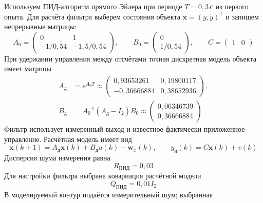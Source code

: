 Используем ПИД-алгоритм прямого Эйлера
при периоде $T=0{,}3\,\text{с}$ из первого опыта.
Для расчёта фильтра выберем состояния объекта
$\bm x=(y,\dot y)^{\mathsf T}$ и запишем непрерывные матрицы:
\begin{equation}
  A_0=\begin{pmatrix}0&1\\-1/0{,}54&-1{,}5/0{,}54\end{pmatrix},
  \qquad B_0=\begin{pmatrix}0\\1/0{,}54\end{pmatrix},
  \qquad C=\begin{pmatrix}1&0\end{pmatrix}
  \label{eq:temperature-continuous-matrices}
\end{equation}
При удержании управления между отсчётами точная дискретная модель
объекта имеет матрицы
\begin{equation}
  \begin{aligned}
    A_{\text{д}}&=e^{A_0T}
      \approx\begin{pmatrix}
        0{,}93653261&0{,}19800117\\
        -0{,}36666884&0{,}38652936
      \end{pmatrix},\\
    B_{\text{д}}&=A_0^{-1}(A_{\text{д}}-I_2)B_0
      \approx\begin{pmatrix}0{,}06346739\\0{,}36666884\end{pmatrix}
  \end{aligned}
  \label{eq:temperature-discrete-matrices}
\end{equation}
Фильтр использует измеренный выход и известное фактически приложенное
управление. Расчётная модель имеет вид
\begin{equation}
  \bm x(k+1)=A_{\text{д}}\bm x(k)+B_{\text{д}}u(k)+\bm w_x(k),
  \qquad y_{\text{и}}(k)=C\bm x(k)+v(k)
  \label{eq:temperature-kalman-model}
\end{equation}
Дисперсия шума измерения равна
\begin{equation}
  R_{\text{ПИД}}=0{,}03
  \label{eq:temperature-measurement-variance}
\end{equation}
Для настройки фильтра выбрана ковариация расчётной модели
\begin{equation}
  Q_{\text{ПИД}}=0{,}01I_2
  \label{eq:temperature-process-covariance}
\end{equation}
В моделируемый контур подаётся измерительный шум; выбранная

